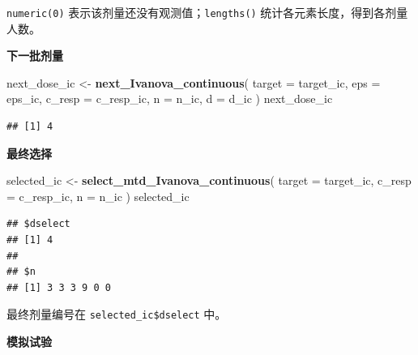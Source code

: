 \documentclass[
  chinese,
]{article}
\newenvironment{Shaded}{\begin{snugshade}}{\end{snugshade}}
\newcommand{\AttributeTok}[1]{\textcolor[rgb]{0.13,0.29,0.53}{#1}}
\newcommand{\FunctionTok}[1]{\textcolor[rgb]{0.13,0.29,0.53}{\textbf{#1}}}
\newcommand{\NormalTok}[1]{#1}
\newcommand{\OtherTok}[1]{\textcolor[rgb]{0.56,0.35,0.01}{#1}}
\begin{document}
\texttt{numeric(0)} 表示该剂量还没有观测值；\texttt{lengths()}
统计各元素长度，得到各剂量人数。

\textbf{下一批剂量}

\begin{Shaded}
\begin{Highlighting}[]
\NormalTok{next\_dose\_ic }\OtherTok{\textless{}{-}} \FunctionTok{next\_Ivanova\_continuous}\NormalTok{(}
  \AttributeTok{target =}\NormalTok{ target\_ic, }\AttributeTok{eps =}\NormalTok{ eps\_ic,}
  \AttributeTok{c\_resp =}\NormalTok{ c\_resp\_ic, }\AttributeTok{n =}\NormalTok{ n\_ic, }\AttributeTok{d =}\NormalTok{ d\_ic}
\NormalTok{)}
\NormalTok{next\_dose\_ic}
\end{Highlighting}
\end{Shaded}

\begin{verbatim}
## [1] 4
\end{verbatim}

\textbf{最终选择}

\begin{Shaded}
\begin{Highlighting}[]
\NormalTok{selected\_ic }\OtherTok{\textless{}{-}} \FunctionTok{select\_mtd\_Ivanova\_continuous}\NormalTok{(}
  \AttributeTok{target =}\NormalTok{ target\_ic, }\AttributeTok{c\_resp =}\NormalTok{ c\_resp\_ic, }\AttributeTok{n =}\NormalTok{ n\_ic}
\NormalTok{)}
\NormalTok{selected\_ic}
\end{Highlighting}
\end{Shaded}

\begin{verbatim}
## $dselect
## [1] 4
## 
## $n
## [1] 3 3 3 9 0 0
\end{verbatim}

最终剂量编号在 \texttt{selected\_ic\$dselect} 中。

\textbf{模拟试验}
\end{document}
